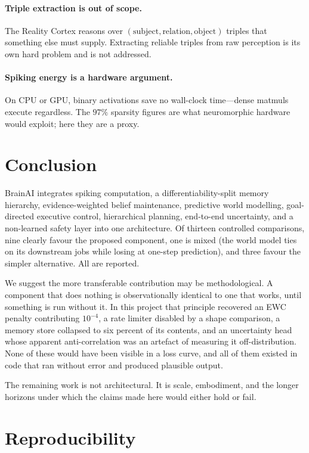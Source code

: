\documentclass[10pt,twocolumn]{article}
\begin{document}
\paragraph{Triple extraction is out of scope.} The Reality Cortex reasons over
$(\text{subject},\text{relation},\text{object})$ triples that something else
must supply. Extracting reliable triples from raw perception is its own hard
problem and is not addressed.

\paragraph{Spiking energy is a hardware argument.} On CPU or GPU, binary
activations save no wall-clock time---dense matmuls execute regardless. The
$97\%$ sparsity figures are what neuromorphic hardware would exploit; here they
are a proxy.

\section{Conclusion}

BrainAI integrates spiking computation, a differentiability-split memory
hierarchy, evidence-weighted belief maintenance, predictive world modelling,
goal-directed executive control, hierarchical planning, end-to-end uncertainty,
and a non-learned safety layer into one architecture. Of thirteen controlled
comparisons, nine clearly favour the proposed component, one is mixed (the
world model ties on its downstream jobs while losing at one-step prediction),
and three favour the simpler alternative. All are reported.

We suggest the more transferable contribution may be methodological. A
component that does nothing is observationally identical to one that works,
until something is run without it. In this project that principle recovered an
EWC penalty contributing $10^{-4}$, a rate limiter disabled by a shape
comparison, a memory store collapsed to six percent of its contents, and an
uncertainty head whose apparent anti-correlation was an artefact of measuring
it off-distribution. None of these would have been visible in a loss curve, and
all of them existed in code that ran without error and produced plausible
output.

The remaining work is not architectural. It is scale, embodiment, and the
longer horizons under which the claims made here would either hold or fail.

\section*{Reproducibility}
\end{document}
